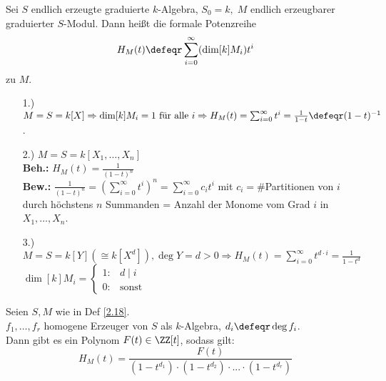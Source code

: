 \begin{Def}
\label{2.18}
  Sei $S$ endlich erzeugte graduierte $k$-Algebra, $S_0 = k,\; M$ endlich
  erzeugbarer graduierter $S$-Modul. Dann heißt die formale Potenzreihe $$H_M(t)
  \defeqr \sum_{i=0}^{\infty} (\dim[k]{M_i}) t^i$$
   zu $M$.
\end{Def}

\begin{nnBsp}
  \begin{enumerate}
    \item[1.)] $M = S = k[X] \Rightarrow \dim[k]{M_i} = 1 \text{ für alle }i
               \Rightarrow H_M(t) = \sum_{i=0}^{\infty}t^i = \frac{1}{1-t}
               \defeqr (1-t)^{-1}$.
    \item[2.)] $M = S = k[X_1, \dots, X_n]$\\
               \textbf{Beh.:} $H_M(t) = \frac{1}{(1-t)^n}$\\
               \textbf{Bew.:} $\frac{1}{(1-t)^n} = \left( \sum_{i=0}^{\infty}
               t^i\right)^n = \sum_{i=0}^{\infty} c_i t^i$ mit $c_i =
               \#$Partitionen von $i$ durch höchstens $n$ Summanden = Anzahl der
               Monome vom Grad $i$ in $X_1, \dots, X_n$.
    \item[3.)] $M = S = k[Y] (\cong k[X^d]), \deg{Y} = d > 0 \Rightarrow
               H_M(t) = \sum_{i = 0}^{\infty} t^{d \cdot i} = \frac{1}{1-t^d}$\\
               $\dim[k]{M_i} = \begin{cases}1: & d \mid i\\ 0: & \text{sonst} \end{cases}$
  \end{enumerate}
\end{nnBsp}

\begin{nnSatz}
  Seien $S, M$ wie in Def \ref{2.18}.\\
  $f_1, \dots, f_r$ homogene Erzeuger von $S$ als $k$-Algebra, $d_i \defeqr
  \deg{f_i}$.\\
  Dann gibt es ein Polynom $F(t) \in \ZZ[t]$, sodass gilt:
  $$ H_M(t) = \frac{F(t)}{(1-t^{d_1}) \cdot (1-t^{d_2}) \cdot ... \cdot 
  (1-t^{d_r})}$$
\end{nnSatz}

